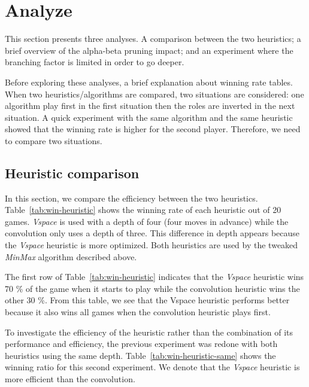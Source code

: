 \documentclass[runningheads]{llncs}
\begin{document}
\clearpage
\section{Analyze}
This section presents three analyses. A comparison
between the two heuristics; a brief  overview of
the alpha-beta pruning impact; and an experiment
where the branching factor is limited in order to
go deeper.

Before exploring these analyses, a brief
explanation about winning rate tables. When two
heuristics/algorithms are compared, two situations
are considered: one algorithm
play first in the first situation then the roles
are inverted in the next situation. A quick experiment with the
same algorithm and the same heuristic showed that
the winning rate is higher for the second player.
Therefore, we need to compare two situations.

\subsection{Heuristic comparison}
In this section, we compare the efficiency between
the two heuristics. Table~\ref{tab:win-heuristic}
shows the winning rate of each heuristic out of 20
games. \textit{Vspace} is used with a depth of
four (four moves in advance) while the convolution
only uses a depth of three. This difference in
depth appears because the \textit{Vspace}
heuristic is more optimized. Both heuristics are
used by the tweaked \textit{MinMax} algorithm described
above.

The first row of Table~\ref{tab:win-heuristic}
indicates that the \textit{Vspace} heuristic wins
70 \%  of the game when it starts to play while the
convolution heuristic wins the other 30 \%.
From this table, we see that the Vspace heuristic
performs better because it also wins all games
when the convolution heuristic plays first.

To investigate the efficiency of the heuristic
rather than the combination of its performance and
efficiency, the previous experiment was redone
with both heuristics using the same depth.
Table~\ref{tab:win-heuristic-same} shows the
winning ratio for this second experiment. We
denote that the \textit{Vspace} heuristic is more
efficient than the convolution. 
\end{document}
